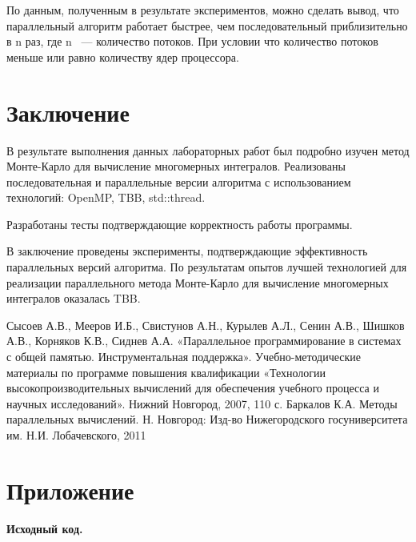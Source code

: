 \documentclass{report}
\begin{document}
\par По данным, полученным в результате экспериментов, можно сделать вывод, что параллельный алгоритм работает быстрее, чем последовательный приблизительно в n раз, где n ~--- количество потоков. При условии что количество потоков меньше или равно количеству ядер процессора.
\newpage

\section*{Заключение}
В результате выполнения данных лабораторных работ был подробно изучен метод Монте-Карло для вычисление многомерных интегралов.
Реализованы последовательная и параллельные версии алгоритма с использованием технологий: OpenMP, TBB, std::thread.
\par Разработаны тесты подтверждающие корректность работы программы.
\par В заключение проведены эксперименты, подтверждающие эффективность параллельных версий алгоритма. По результатам опытов лучшей технологией для реализации параллельного метода Монте-Карло для вычисление многомерных интегралов оказалась TBB.
\newpage

\begin{thebibliography}{1}
 Сысоев А.В., Мееров И.Б., Свистунов А.Н., Курылев А.Л., Сенин А.В., Шишков А.В., Корняков К.В., Сиднев А.А. «Параллельное программирование в системах с общей памятью. Инструментальная поддержка». Учебно-методические материалы по программе повышения квалификации «Технологии высокопроизводительных вычислений для обеспечения учебного процесса и научных исследований». Нижний Новгород, 2007, 110 с. 
 Баркалов К.А. Методы параллельных вычислений. Н. Новгород: Изд-во Нижегородского госуниверситета им. Н.И. Лобачевского, 2011
\end{thebibliography}
\newpage

\section*{Приложение}
\centerline{\bfseries Исходный код.} 
\end{document}
